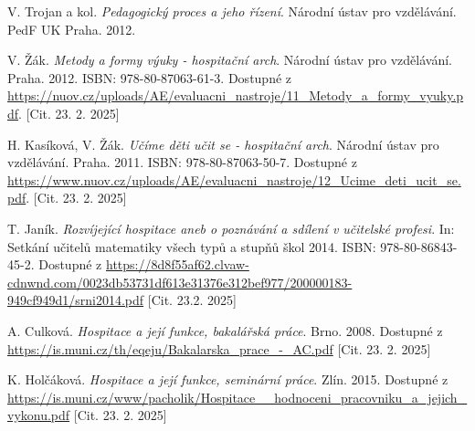 

\raggedright
\sloppy

\begin{thebibliography}{99}

 V. Trojan a kol. \emph{Pedagogický proces a jeho
řízení}. Národní ústav pro vzdělávání. PedF UK Praha. 2012. 

 V. Žák. \emph{Metody a formy výuky - hospitační arch}. Národní ústav pro vzdělávání. Praha. 2012. ISBN: 978-80-87063-61-3. Dostupné z \url{https://nuov.cz/uploads/AE/evaluacni_nastroje/11_Metody_a_formy_vyuky.pdf}. [Cit. 23. 2. 2025]

 H. Kasíková, V. Žák. \emph{Učíme děti učit se - hospitační arch}. Národní ústav pro vzdělávání. Praha. 2011. ISBN: 978-80-87063-50-7. Dostupné z \url{https://www.nuov.cz/uploads/AE/evaluacni_nastroje/12_Ucime_deti_ucit_se.pdf}. [Cit. 23. 2. 2025]

 T. Janík. \emph{Rozvíjející hospitace aneb o poznávání a sdílení v učitelské profesi}.  In: Setkání učitelů matematiky všech typů a stupňů škol 2014. ISBN: 978-80-86843-45-2. Dostupné z \url{https://8d8f55af62.clvaw-cdnwnd.com/0023db53731df613e31376e312bef977/200000183-949cf949d1/srni2014.pdf} [Cit. 23.2. 2025]

 A. Culková. \emph{Hospitace a její funkce, bakalářská práce}. Brno. 2008. Dostupné z \url{https://is.muni.cz/th/eqeju/Bakalarska_prace_-_AC.pdf} [Cit. 23. 2. 2025]

 K. Holčáková. \emph{Hospitace a její funkce, seminární práce}. Zlín. 2015. Dostupné z \url{https://is.muni.cz/www/pacholik/Hospitace__hodnoceni_pracovniku_a_jejich_vykonu.pdf} [Cit. 23. 2. 2025]


\end{thebibliography}
